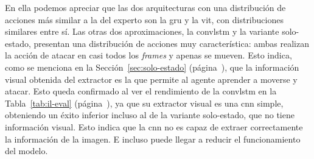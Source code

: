 En ella podemos apreciar que las dos arquitecturas con una distribución de acciones más similar a la del
experto son la \gls{gru} y la \gls{vit}, con distribuciones similares entre sí. Las otras dos aproximaciones,
la \gls{convlstm} y la variante solo-estado, presentan una distribución de acciones muy característica:
ambas realizan la acción de atacar en casi todos los \textit{frames} y apenas se mueven. Esto indica, como
se menciona en la Sección~\ref{sec:solo-estado} (página~\pageref{sec:solo-estado}), que la información visual obtenida del extractor es
la que permite al agente aprender a moverse y atacar. Esto queda confirmado al ver el rendimiento
de la \gls{convlstm} en la Tabla~\ref{tab:il-eval} (página~\pageref{tab:il-eval}), ya que su extractor visual
es una \gls{cnn} simple, obteniendo un éxito inferior
incluso al de la variante solo-estado, que no tiene información visual. Esto indica que la \gls{cnn} no es
capaz de extraer correctamente la información de la imagen. E incluso puede llegar a reducir el funcionamiento del modelo.

\begin{table}[htbp]
  \centering
  \small
  \caption[Evaluación de las técnicas de imitación]{Evaluación de las técnicas de imitación bajo la métrica común recoger $k=\num{5}$ troncos.
  Troncos y tiempo por episodio: media ($\mu$), mediana (\textbf{$\tilde{x}$}) y desviación típica ($\sigma$).}
  \label{tab:il-eval}
\end{table}


